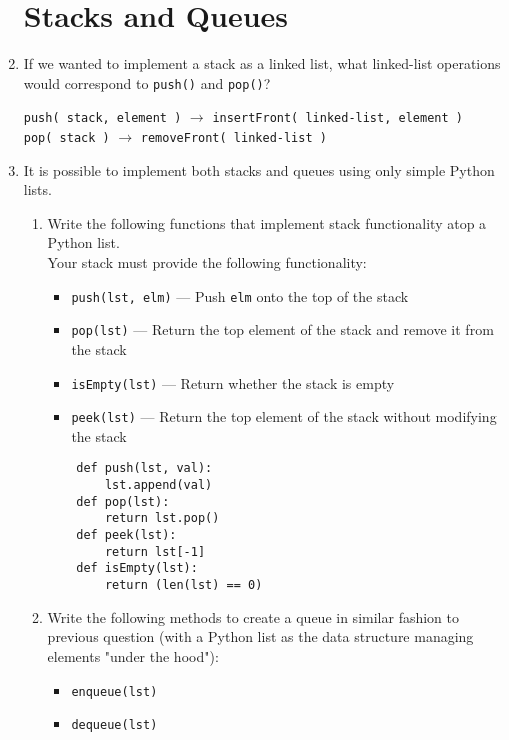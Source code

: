 \documentclass[11pt]{article}
\newenvironment{answer}{\large\lstset{basicstyle=\tiny\ttfamily}\color{white}}{}
\newenvironment{answer}{\large\lstset{basicstyle=\large\ttfamily}\color{red}}{}
\begin{document}
\begin{enumerate}
\pagebreak
\section*{Stacks and Queues}
\item If we wanted to implement a stack as a linked list, what linked-list
	operations would correspond to \texttt{push()} and \texttt{pop()}?

	\begin{answer}
	\texttt{push( stack, element )} $\rightarrow$ \texttt{insertFront( linked-list, element )} \\
	\texttt{pop( stack )} $\rightarrow$ \texttt{removeFront( linked-list )}
	\end{answer}

\item It is possible to implement both stacks and queues using only simple Python lists.
\begin{enumerate}
\item Write the following functions that implement stack functionality atop a Python list. \\
Your stack must provide the following functionality:
	  \begin{itemize}
	  \item []\texttt{push(lst, elm)} --- Push \texttt{elm} onto the top of the stack
	  \item []\texttt{pop(lst)} --- Return the top element of the stack and remove it from the stack
	  \item []\texttt{isEmpty(lst)} --- Return whether the stack is empty
	  \item []\texttt{peek(lst)} --- Return the top element of the stack without modifying the stack 
	  \end{itemize}
	  \begin{answer}
	  \begin{lstlisting}
	def push(lst, val):
		lst.append(val)
	def pop(lst):
		return lst.pop()
	def peek(lst):
		return lst[-1]
	def isEmpty(lst):
		return (len(lst) == 0)
	  \end{lstlisting}
	  \end{answer}

\item Write the following methods to create a queue in similar fashion to previous question (with a Python list as the data structure managing elements "under the hood"):
	\begin{itemize}
	\item []\texttt{enqueue(lst)}
	\item []\texttt{dequeue(lst)}
	\end{itemize}


\end{enumerate}
\end{enumerate}
\end{document}
